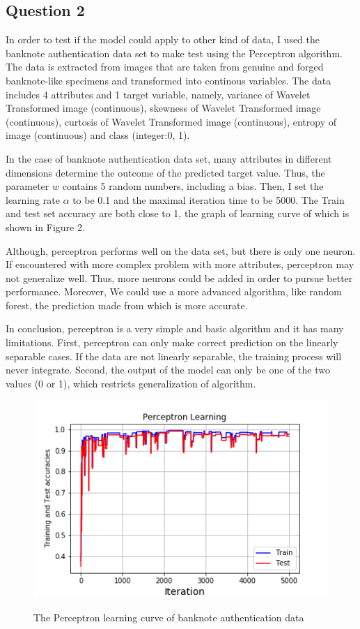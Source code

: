 \documentclass[10pt]{article}
\begin{document}
\subsection{Question 2}

In order to test if the model could apply to other kind of data, I used the banknote authentication data set to make test using the Perceptron algorithm. The data is extracted from images that are taken from genuine and forged banknote-like specimens and transformed into continous variables. The data includes 4 attributes and 1 target variable, namely, variance of Wavelet Transformed image (continuous), skewness of Wavelet Transformed image (continuous), curtosis of Wavelet Transformed image (continuous), entropy of image (continuous) and class (integer:0, 1). 

In the case of banknote authentication data set, many attributes in different dimensions determine the outcome of the predicted target value. Thus, the parameter $w$ contains 5 random numbers, including a bias. Then, I set the learning rate $\alpha$ to be 0.1 and the maximal iteration time to be 5000. The Train and test set accuracy are both close to 1, the graph of learning curve of which is shown in Figure 2. 

Although, perceptron performs well on the data set, but there is only one neuron. If encountered with more complex problem with more attributes, perceptron may not generalize well. Thus, more neurons could be added in order to pursue better performance. Moreover, We could use a more advanced algorithm, like random forest, the prediction made from which is more accurate.

In conclusion, perceptron is a very simple and basic algorithm and it has many limitations. First, perceptron can only make correct prediction on the linearly separable cases. If the data are not linearly separable, the training process will never integrate. Second, the output of the model can only be one of the two values (0 or 1), which restricts generalization of algorithm. 



\begin{figure} %
	\centering  %
	\vspace{-0.35cm} %
	\label{level.sub.1}
	\includegraphics[width=0.32\linewidth]{LearningCurvesalpha0.002.png}
	\caption{The Perceptron learning curve of banknote authentication data}
\end{figure}
\end{document}
